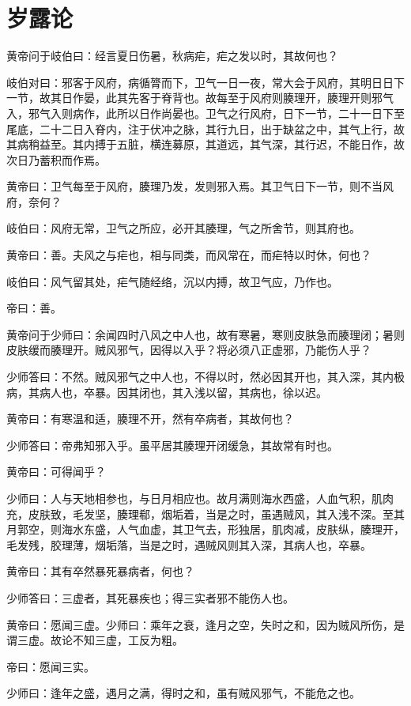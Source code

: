 \documentclass[a4paper,12pt,UTF8,twoside]{ctexbook}
\begin{document}
	\chapter{岁露论}
	
	黄帝问于岐伯曰：经言夏日伤暑，秋病疟，疟之发以时，其故何也？
	
	岐伯对曰：邪客于风府，病循膂而下，卫气一日一夜，常大会于风府，其明日日下一节，故其日作晏，此其先客于脊背也。故每至于风府则腠理开，腠理开则邪气入，邪气入则病作，此所以日作尚晏也。卫气之行风府，日下一节，二十一日下至尾底，二十二日入脊内，注于伏冲之脉，其行九日，出于缺盆之中，其气上行，故其病稍益至。其内搏于五脏，横连募原，其道远，其气深，其行迟，不能日作，故次日乃蓄积而作焉。
	
	黄帝曰：卫气每至于风府，腠理乃发，发则邪入焉。其卫气日下一节，则不当风府，奈何？
	
	岐伯曰：风府无常，卫气之所应，必开其腠理，气之所舍节，则其府也。
	
	黄帝曰：善。夫风之与疟也，相与同类，而风常在，而疟特以时休，何也？
	
	岐伯曰：风气留其处，疟气随经络，沉以内搏，故卫气应，乃作也。
	
	帝曰：善。
	
	黄帝问于少师曰：余闻四时八风之中人也，故有寒暑，寒则皮肤急而腠理闭；暑则皮肤缓而腠理开。贼风邪气，因得以入乎？将必须八正虚邪，乃能伤人乎？
	
	少师答曰：不然。贼风邪气之中人也，不得以时，然必因其开也，其入深，其内极病，其病人也，卒暴。因其闭也，其入浅以留，其病也，徐以迟。
	
	黄帝曰：有寒温和适，腠理不开，然有卒病者，其故何也？
	
	少师答曰：帝弗知邪入乎。虽平居其腠理开闭缓急，其故常有时也。
	
	黄帝曰：可得闻乎？
	
	少师曰：人与天地相参也，与日月相应也。故月满则海水西盛，人血气积，肌肉充，皮肤致，毛发坚，腠理郗，烟垢着，当是之时，虽遇贼风，其入浅不深。至其月郭空，则海水东盛，人气血虚，其卫气去，形独居，肌肉减，皮肤纵，腠理开，毛发残，胶理薄，烟垢落，当是之时，遇贼风则其入深，其病人也，卒暴。
	
	黄帝曰：其有卒然暴死暴病者，何也？
	
	少师答曰：三虚者，其死暴疾也；得三实者邪不能伤人也。
	
	黄帝曰：愿闻三虚。少师曰：乘年之衰，逢月之空，失时之和，因为贼风所伤，是谓三虚。故论不知三虚，工反为粗。
	
	帝曰：愿闻三实。
	
	少师曰：逢年之盛，遇月之满，得时之和，虽有贼风邪气，不能危之也。
	
\end{document}
